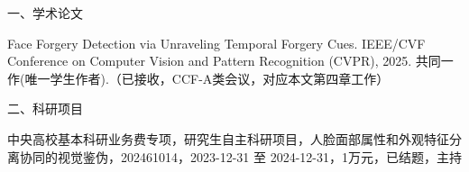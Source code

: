 \begin{resume}

\newcommand{\smalltitle}[1]{%
    \noindent %
    {\heiti\zihao{4} #1} %
}

\smalltitle{一、学术论文}
\begin{achievements}
  \item Face Forgery Detection via Unraveling Temporal Forgery Cues. IEEE/CVF Conference on Computer Vision and Pattern Recognition (CVPR), 2025. 共同一作(唯一学生作者).（已接收，CCF-A类会议，对应本文第四章工作）

\end{achievements}

\smalltitle{二、科研项目} 
\begin{achievements}[start=1]
        \item 中央高校基本科研业务费专项，研究生自主科研项目，人脸面部属性和外观特征分离协同的视觉鉴伪，202461014，2023-12-31 至 2024-12-31，1万元，已结题，主持

\end{achievements}



\end{resume}
